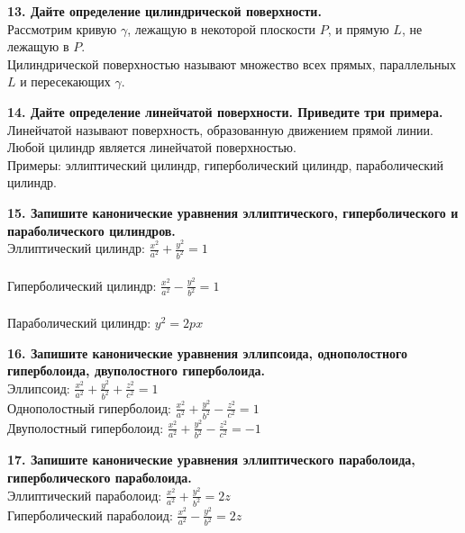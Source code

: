 \documentclass[11pt,a4paper]{article}
\begin{document}
\textbf{13. Дайте определение цилиндрической поверхности.\\}
Рассмотрим кривую $\gamma$, лежащую в некоторой плоскости $P$, и прямую $L$, не лежащую в $P$.
\\
Цилиндрической поверхностью называют множество всех прямых, параллельных $L$ и пересекающих $\gamma$.

\textbf{14. Дайте определение линейчатой поверхности. Приведите три примера.\\}
Линейчатой называют поверхность, образованную движением прямой линии.
\\
Любой цилиндр является линейчатой поверхностью.
\\
Примеры: эллиптический цилиндр, гиперболический цилиндр, параболический цилиндр.

\textbf{15. Запишите канонические уравнения эллиптического, гиперболического и параболического цилиндров.\\}
Эллиптический цилиндр: $\frac{x^2}{a^2} + \frac{y^2}{b^2} = 1$
\\
\\
Гиперболический цилиндр: $\frac{x^2}{a^2} - \frac{y^2}{b^2} = 1$
\\
\\
Параболический цилиндр: $y^2 = 2px$

\textbf{16. Запишите канонические уравнения эллипсоида, однополостного гиперболоида, двуполостного гиперболоида.\\}
Эллипсоид: $\frac{x^2}{a^2} + \frac{y^2}{b^2} + \frac{z^2}{c^2} = 1$
\\
Однополостный гиперболоид: $\frac{x^2}{a^2} + \frac{y^2}{b^2} - \frac{z^2}{c^2} = 1$
\\
Двуполостный гиперболоид: $\frac{x^2}{a^2} + \frac{y^2}{b^2} - \frac{z^2}{c^2} = -1$

\textbf{17. Запишите канонические уравнения эллиптического параболоида, гиперболического параболоида.\\}
Эллиптический параболоид: $\frac{x^2}{a^2} + \frac{y^2}{b^2} = 2z$
\\
Гиперболический параболоид: $\frac{x^2}{a^2} - \frac{y^2}{b^2} = 2z$
\end{document}
